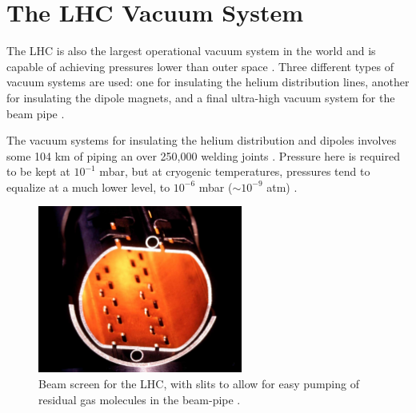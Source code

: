 \section{The LHC Vacuum System}
\label{lhc_vacuum_overview}

\par The LHC is also the largest operational vacuum system in the
world and is capable of achieving pressures lower than outer space
\cite{LHC:LHC_lhc_vacuum_cernWebsite}.  Three different types of
vacuum systems are used: one for insulating the helium distribution
lines, another for insulating the dipole magnets, and a final
ultra-high vacuum system for the beam pipe
\cite{lhc:machine_description}.  

\par The vacuum systems for insulating the helium distribution and
dipoles involves some 104 km of piping an over 250,000 welding
joints \cite{LHC:LHC_lhc_vacuum_cernWebsite}.  Pressure here is
required to be kept at $10^{-1}$ mbar, but at cryogenic temperatures,
pressures tend to equalize at a much lower level, to $10^{-6}$ mbar
($\sim10^{-9}$ atm) \cite{lhc:machine_description}.   

\begin{figure}[h]
   \centering
  \includegraphics[width=0.6\textwidth]{Figures/LHC_Diagrams/LHC_BeamScreen.jpg}
  \caption{Beam screen for the LHC, with slits to allow for easy
    pumping of residual gas molecules in the beam-pipe \cite{LHC:LHC_lhc_beamScreen_image}.} \label{fig:lhc_beam_screen}
\end{figure}

